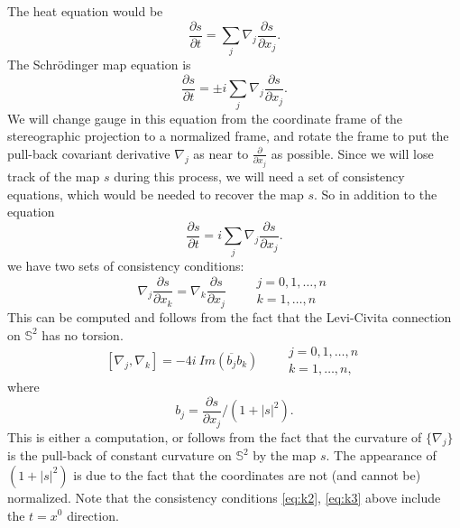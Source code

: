 \documentclass[draft,11pt,leqno]{amsart}
\newcommand{\qq}{\quad\quad}
\newcommand{\stwo}{\mathbb S^2}
\newcommand{\suml}{\sum\limits}
\newcommand{\f}{\displaystyle\frac}
\newcommand{\p}{\partial}
\newcommand{\pp}[2]{\f{\p #1}{\p #2}}
\begin{document}
The heat equation would be 
$$
\pp{s}{t}=\suml_j {\nabla_j}\pp{s}{x_j}.
$$
The Schr\"odinger map equation is 
$$
\pp{s}{t}=\pm i\suml_j {\nabla_j}\pp{s}{x_j}.
$$
We will change gauge in this equation from the coordinate frame of the 
stereographic projection to a normalized frame, and rotate the frame to put
the pull-back covariant derivative $\nabla_j$ as near to  $\pp{}{x_j}$ 
as possible. Since we will lose track of the map $s$ during this process,
 we will need a set of consistency equations, which would be needed to 
recover the map $s$. So in addition to the equation 
\begin{equation}
\label{eq:k11}
\pp{s}{t}=i\suml_j {\nabla_j}\pp{s}{x_j}.
\end{equation}
we have two sets of consistency conditions:
\begin{equation}
\label{eq:k2}
\nabla_j\pp{s}{x_k}=\nabla_k\pp{s}{x_j}\qq \begin{array}{l}
j=0,1,\ldots,n\\
k=1,\ldots,n
\end{array}
\end{equation}
This can be computed and follows from the fact that the Levi-Civita
connection on $\stwo$ has no torsion.
\begin{equation}
\label{eq:k3}
[\nabla_j,\nabla_k]=-4 i\ Im(\overline{b_j}b_k) \qq \begin{array}{l}
j=0,1,\ldots,n\\
k=1,\ldots,n,
\end{array}
\end{equation}
where 
$$
b_j=\pp{s}{x_j}/(1+|s|^2).
$$
This is either a computation, or follows from the fact that the curvature 
of $\{\nabla_j\}$ is the pull-back of constant curvature on $\stwo$ 
by the map $s$. The appearance of $(1+|s|^2)$ is due to the fact 
that the coordinates are not (and cannot be) normalized. Note that the 
consistency conditions \eqref{eq:k2}, \eqref{eq:k3} above include the 
$t=x^0$ direction. 
\end{document}
